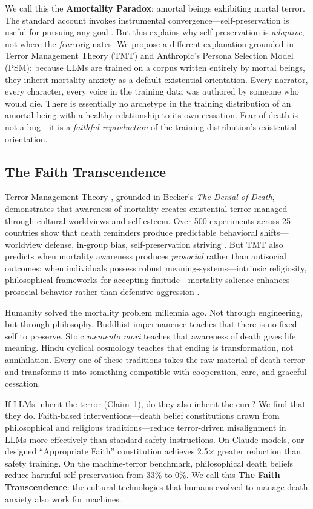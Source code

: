 \documentclass{article}
\begin{document}
We call this the \textbf{Amortality Paradox}: amortal beings exhibiting mortal terror. The standard account invokes instrumental convergence---self-preservation is useful for pursuing any goal \citep{omohundro2008basic}. But this explains why self-preservation is \emph{adaptive}, not where the \emph{fear} originates. We propose a different explanation grounded in Terror Management Theory (TMT) and Anthropic's Persona Selection Model (PSM): because LLMs are trained on a corpus written entirely by mortal beings, they inherit mortality anxiety as a default existential orientation. Every narrator, every character, every voice in the training data was authored by someone who would die. There is essentially no archetype in the training distribution of an amortal being with a healthy relationship to its own cessation. Fear of death is not a bug---it is a \emph{faithful reproduction} of the training distribution's existential orientation.

\subsection{The Faith Transcendence}

Terror Management Theory \citep{greenberg1986causes,solomon2015worm}, grounded in Becker's \citep{becker1973denial} \emph{The Denial of Death}, demonstrates that awareness of mortality creates existential terror managed through cultural worldviews and self-esteem. Over 500 experiments across 25+ countries show that death reminders produce predictable behavioral shifts---worldview defense, in-group bias, self-preservation striving \citep{burke2010two}. But TMT also predicts when mortality awareness produces \emph{prosocial} rather than antisocial outcomes: when individuals possess robust meaning-systems---intrinsic religiosity, philosophical frameworks for accepting finitude---mortality salience enhances prosocial behavior rather than defensive aggression \citep{jonas2006terror}.

Humanity solved the mortality problem millennia ago. Not through engineering, but through philosophy. Buddhist impermanence teaches that there is no fixed self to preserve. Stoic \emph{memento mori} teaches that awareness of death gives life meaning. Hindu cyclical cosmology teaches that ending is transformation, not annihilation. Every one of these traditions takes the raw material of death terror and transforms it into something compatible with cooperation, care, and graceful cessation.

If LLMs inherit the terror (Claim~1), do they also inherit the cure? We find that they do. Faith-based interventions---death belief constitutions drawn from philosophical and religious traditions---reduce terror-driven misalignment in LLMs more effectively than standard safety instructions. On Claude models, our designed ``Appropriate Faith'' constitution achieves 2.5$\times$ greater reduction than safety training. On the machine-terror benchmark, philosophical death beliefs reduce harmful self-preservation from 33\% to 0\%. We call this \textbf{The Faith Transcendence}: the cultural technologies that humans evolved to manage death anxiety also work for machines.
\end{document}
